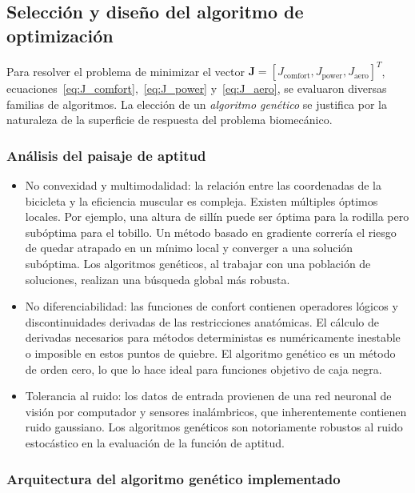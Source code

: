 \subsection{Selección y diseño del algoritmo de optimización}

Para resolver el problema de minimizar el vector $\mathbf{J} =
  [J_{\text{comfort}}, J_{\text{power}}, J_{\text{aero}}]^T$, ecuaciones~\ref{eq:J_comfort},~\ref{eq:J_power} y~\ref{eq:J_aero}, se evaluaron
diversas familias de algoritmos. La elección de un \textit{algoritmo genético}
se justifica por la naturaleza de la superficie de respuesta del problema
biomecánico.

\subsubsection{Análisis del paisaje de aptitud}

\begin{itemize}
  \item No convexidad y multimodalidad: la relación entre las coordenadas de la
        bicicleta y la eficiencia muscular es compleja. Existen múltiples óptimos
        locales. Por ejemplo, una altura de sillín puede ser óptima para la rodilla
        pero subóptima para el tobillo. Un método basado en gradiente correría el
        riesgo de quedar atrapado en un mínimo local y converger a una solución
        subóptima. Los algoritmos genéticos, al trabajar con una población de
        soluciones, realizan una búsqueda global más robusta.
  \item No diferenciabilidad: las funciones de confort contienen operadores lógicos y
        discontinuidades derivadas de las restricciones anatómicas. El cálculo de
        derivadas necesarios para métodos deterministas es numéricamente inestable o
        imposible en estos puntos de quiebre. El algoritmo genético es un método de
        orden cero, lo que lo hace ideal para funciones objetivo de caja negra.
  \item Tolerancia al ruido: los datos de entrada provienen de una red neuronal de
        visión por computador y sensores inalámbricos, que inherentemente contienen
        ruido gaussiano. Los algoritmos genéticos son notoriamente robustos al ruido
        estocástico en la evaluación de la función de aptitud.
\end{itemize}

\subsubsection{Arquitectura del algoritmo genético implementado}
\label{sssec:arq_ag}

